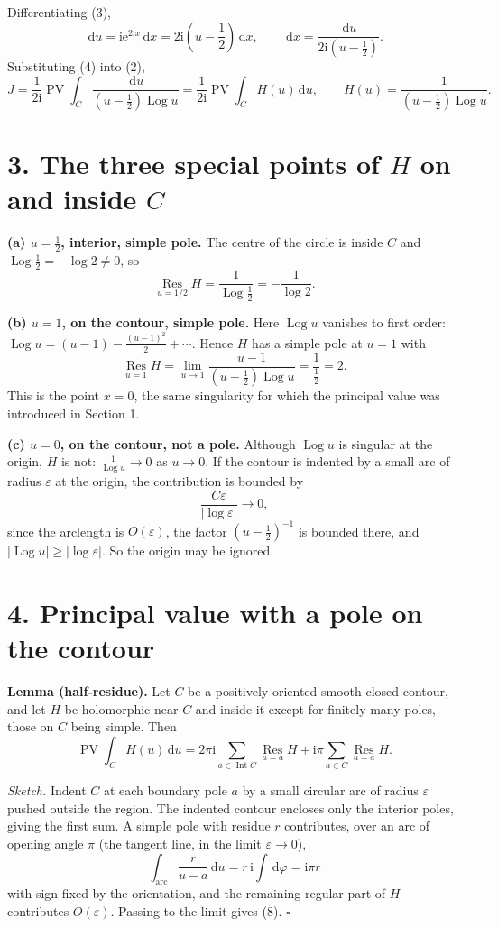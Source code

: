 \documentclass[12pt]{article}
\newcommand{\dd}{\,\mathrm{d}}
\newcommand{\ii}{\mathrm{i}}
\newcommand{\e}{\mathrm{e}}
\newcommand{\Log}{\operatorname{Log}}
\newcommand{\res}{\operatorname*{Res}}
\newcommand{\PV}{\operatorname{PV}}
\newcommand{\Int}{\operatorname{Int}}
\begin{document}
Differentiating (3),
\[
\dd u=\ii\e^{2\ii x}\dd x=2\ii\left(u-\frac12\right)\dd x,
\qquad
\dd x=\frac{\dd u}{2\ii\left(u-\frac12\right)}.
\tag{4}
\]
Substituting (4) into (2),
\[
J=\frac1{2\ii}\PV\int_C
\frac{\dd u}{\left(u-\frac12\right)\Log u}
=\frac1{2\ii}\PV\int_C H(u)\dd u,
\qquad
H(u)=\frac1{\left(u-\frac12\right)\Log u}.
\tag{5}
\]

\section*{3. The three special points of \(H\) on and inside \(C\)}

\textbf{(a) \(u=\frac12\), interior, simple pole.} The centre of the
circle is inside \(C\) and \(\Log\frac12=-\log2\ne0\), so
\[
\res_{u=1/2}H=\frac1{\Log\frac12}=-\frac1{\log2}.
\tag{6}
\]

\textbf{(b) \(u=1\), on the contour, simple pole.} Here \(\Log u\)
vanishes to first order: \(\Log u=(u-1)-\frac{(u-1)^2}{2}+\cdots\). Hence
\(H\) has a simple pole at \(u=1\) with
\[
\res_{u=1}H
=\lim_{u\to1}\frac{u-1}{\left(u-\frac12\right)\Log u}
=\frac1{\frac12}
=2 .
\tag{7}
\]
This is the point \(x=0\), the same singularity for which the principal
value was introduced in Section 1.

\textbf{(c) \(u=0\), on the contour, not a pole.} Although \(\Log u\)
is singular at the origin, \(H\) is not: \(\frac1{\Log u}\to0\) as
\(u\to0\). If the contour is indented by a small arc of radius
\(\varepsilon\) at the origin, the contribution is bounded by
\[
\frac{C\varepsilon}{|\log\varepsilon|}\longrightarrow0 ,
\]
since the arclength is \(O(\varepsilon)\), the factor
\(\left(u-\frac12\right)^{-1}\) is bounded there, and
\(|\Log u|\ge|\log\varepsilon|\). So the origin may be ignored.

\section*{4. Principal value with a pole on the contour}

\textbf{Lemma (half-residue).}
Let \(C\) be a positively oriented smooth closed contour, and let \(H\)
be holomorphic near \(C\) and inside it except for finitely many poles,
those on \(C\) being simple. Then
\[
\boxed{\displaystyle
\PV\int_C H(u)\dd u
=2\pi\ii\sum_{a\in\Int C}\res_{u=a}H
+\ii\pi\sum_{a\in C}\res_{u=a}H .}
\tag{8}
\]

\textit{Sketch.} Indent \(C\) at each boundary pole \(a\) by a small
circular arc of radius \(\varepsilon\) pushed outside the region. The
indented contour encloses only the interior poles, giving the first sum.
A simple pole with residue \(r\) contributes, over an arc of opening
angle \(\pi\) (the tangent line, in the limit \(\varepsilon\to0\)),
\[
\int_{\text{arc}}\frac{r}{u-a}\dd u
=r\,\ii\!\int\!\dd\varphi=\ii\pi r
\]
with sign fixed by the orientation, and the remaining regular part of
\(H\) contributes \(O(\varepsilon)\). Passing to the limit gives (8).
\(\square\)
\end{document}
